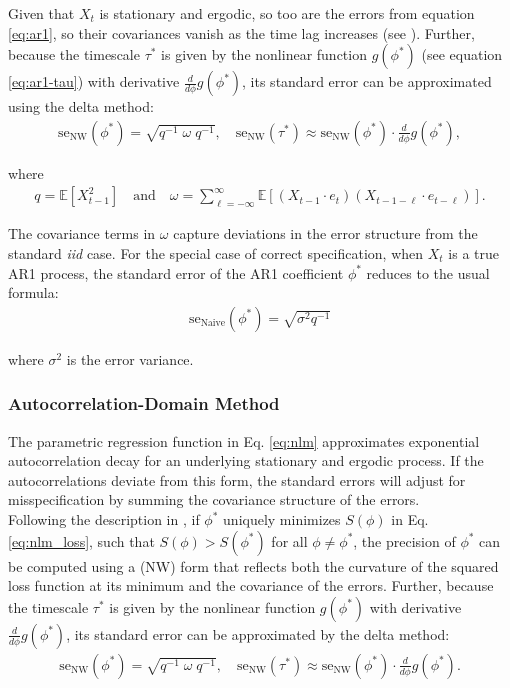 \documentclass[main.tex]{subfiles}
\begin{document}
Given that $X_t$ is stationary and ergodic, so too are the errors from equation \eqref{eq:ar1}, so their covariances vanish as the time lag  increases (see ).  Further, because the timescale $\tau^*$ is given by the nonlinear function $g(\phi^*)$ (see equation \eqref{eq:ar1-tau}) with derivative $\frac{d}{d\phi} g(\phi^*)$, its standard error can be approximated using the delta method:
\begin{align}
    \text{se}_{\text{NW}}(\phi^*) = \sqrt{q^{-1}\; \omega \; q^{-1}} \label{eq:se-ar1-phi}, \quad
    \text{se}_{\text{NW}}(\tau^*) \approx \text{se}_{\text{NW}}(\phi^*) \cdot \frac{d}{d\phi} g(\phi^*),
\end{align}

\noindent where
\begin{align}
    q = \mathbb{E}[X_{t-1}^2] \quad\text{and}\quad \omega = \sum_{\ell=-\infty}^{\infty} \mathbb{E}[(X_{t-1} \cdot e_t)(X_{t-1-\ell} \cdot e_{t-\ell})].
\end{align}

\noindent The covariance terms in $\omega$ capture deviations in the error structure from the standard \textit{iid} case. For the special case of correct specification, when $X_t$ is a true AR1 process, the standard error of the AR1 coefficient $\phi^*$ reduces to the usual formula:
\begin{align}
    \text{se}_{\text{Naive}}(\phi^*) = \sqrt{\sigma^2 q^{-1}}
\end{align}

\noindent where $\sigma^2$ is the error variance. \\

\subsubsection{Autocorrelation-Domain Method}\label{sec:stderr-autocorrelation-domain}
The parametric regression function in Eq. \eqref{eq:nlm} approximates exponential autocorrelation decay for an underlying stationary and ergodic process. If the autocorrelations deviate from this form, the standard errors will adjust for misspecification by summing the covariance structure of the errors.\\

Following the description in \citet[Chapter~22.8 and Chapter~23.5]{hansen_econometrics_2022}, if $\phi^*$ uniquely minimizes $S(\phi)$ in Eq. \eqref{eq:nlm_loss}, such that $S(\phi) > S(\phi^*)$ for all $\phi \neq \phi^*$, the precision of $\phi^*$ can be computed using a \citet{newey_simple_1987} (NW) form that reflects both the curvature of the squared loss function at its minimum and the covariance of the errors. Further, because the timescale $\tau^*$ is given by the nonlinear function $g(\phi^*)$ with derivative $\frac{d}{d\phi} g(\phi^*)$, its standard error can be approximated by the delta method:
\begin{align}\label{eq:stderr-autocorrelation-domain}
    \text{se}_\text{NW}(\phi^*) = \sqrt{q^{-1}\; \omega \;q^{-1}}, \quad \text{se}_\text{NW}(\tau^*) \approx \text{se}_\text{NW}(\phi^*) \cdot \frac{d}{d\phi}g(\phi^*).
\end{align}
\end{document}
